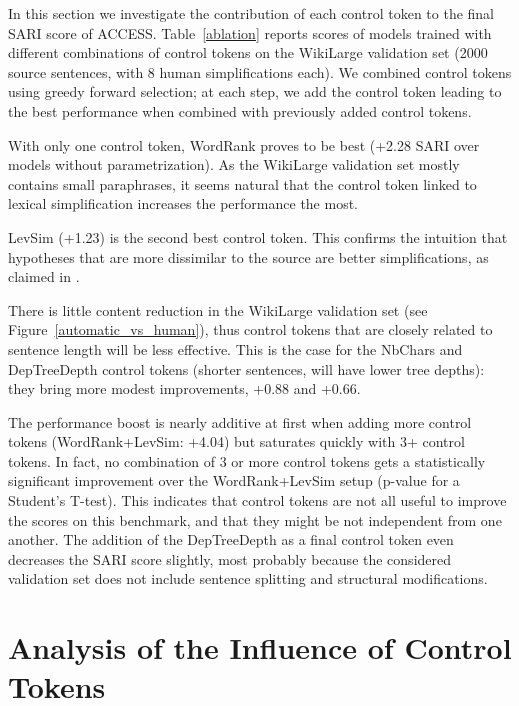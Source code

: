 \documentclass[10pt, a4paper]{article}
\begin{document}
In this section we investigate the contribution of each control token to the final SARI score of \textsc{ACCESS}.
Table~\ref{ablation} reports scores of models trained with different combinations of control tokens on the WikiLarge validation set (2000 source sentences, with 8 human simplifications each). We combined control tokens using greedy forward selection; at each step, we add the control token leading to the best performance when combined with previously added control tokens.

With only one control token, WordRank proves to be best (+2.28 SARI over models without parametrization).
As the WikiLarge validation set mostly contains small paraphrases, it seems natural that the control token linked to lexical simplification increases the performance the most.

LevSim (+1.23) is the second best control token. This confirms the intuition that hypotheses that are more dissimilar to the source are better simplifications, as claimed in \cite{wubben2012sentence,nisioi2017exploring}.

There is little content reduction in the WikiLarge validation set (see Figure~\ref{automatic_vs_human}), thus control tokens that are closely related to sentence length will be less effective. This is the case for the NbChars and DepTreeDepth control tokens (shorter sentences, will have lower tree depths): they bring more modest improvements, +0.88 and +0.66.

The performance boost is nearly additive at first when adding more control tokens (WordRank+LevSim: +4.04) but saturates quickly with 3+ control tokens. In fact, no combination of 3 or more control tokens gets a statistically significant improvement over the WordRank+LevSim setup (p-value  for a Student's T-test).
This indicates that control tokens are not all useful to improve the scores on this benchmark, and that they might be not independent from one another.
The addition of the DepTreeDepth as a final control token even decreases the SARI score slightly, most probably because the considered validation set does not include sentence splitting and structural modifications.


\section{Analysis of the Influence of Control Tokens}
\end{document}
